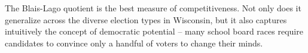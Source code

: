 The Blais-Lago quotient is the best measure of competitiveness. Not only does it 
generalize across the diverse election types in Wisconsin, but it also captures 
intuitively the concept of democratic potential -- many school board races require 
candidates to convince only a handful of voters to change their minds. 

% 
% 
% 

